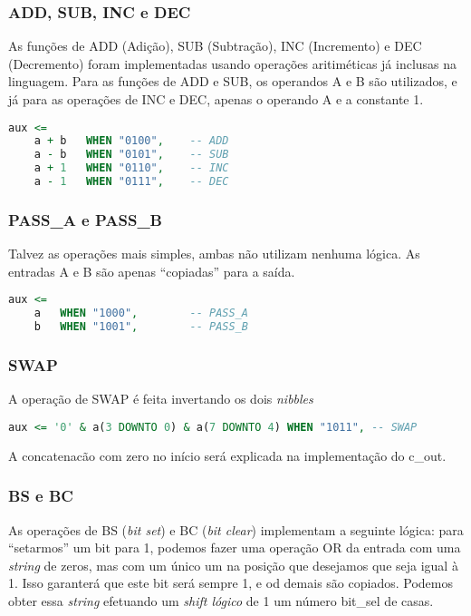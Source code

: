 \documentclass{article}
\begin{document}
\subsubsection{ADD, SUB, INC e DEC}

As funções de ADD (Adição), SUB (Subtração), INC (Incremento) e DEC (Decremento) foram implementadas usando operações aritiméticas já inclusas na linguagem. Para as funções de ADD e SUB, os operandos A e B são utilizados, e já para as operações de INC e DEC, apenas o operando A e a constante 1.

\begin{lstlisting}[language=VHDL]
aux <=  
    a + b   WHEN "0100",    -- ADD
    a - b   WHEN "0101",    -- SUB
    a + 1   WHEN "0110",    -- INC
    a - 1   WHEN "0111",    -- DEC
\end{lstlisting}

\subsubsection{PASS\_A e PASS\_B}

Talvez as operações mais simples, ambas não utilizam nenhuma lógica. As entradas A e B são apenas ``copiadas'' para a saída.

\begin{lstlisting}[language=VHDL]
aux <=  
    a   WHEN "1000",        -- PASS_A
    b   WHEN "1001",        -- PASS_B
\end{lstlisting}

\subsubsection{SWAP}

A operação de SWAP é feita invertando os dois \textit{nibbles}

\begin{lstlisting}[language=VHDL]
aux <= '0' & a(3 DOWNTO 0) & a(7 DOWNTO 4) WHEN "1011", -- SWAP
\end{lstlisting}

A concatenacão com zero no início será explicada na implementação do c\_out.

\subsubsection{BS e BC}

As operações de BS (\textit{bit set}) e BC (\textit{bit clear}) implementam a seguinte lógica: para ``setarmos'' um bit para 1, podemos fazer uma operação OR da entrada com uma \textit{string} de zeros, mas com um único um na posição que desejamos que seja igual à 1. Isso garanterá que este bit será sempre 1, e od demais são copiados. Podemos obter essa \textit{string} efetuando um \textit{shift lógico} de 1 um número bit\_sel de casas.
\end{document}

